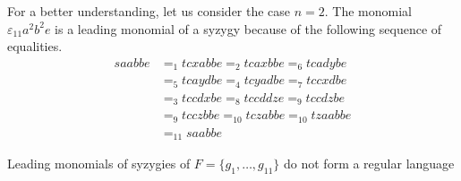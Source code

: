 \documentclass[sigconf]{acmart}
\theoremstyle{plain}
\theoremstyle{definition}
\theoremstyle{remark}
\begin{document}
For a better understanding, let us consider the case $n=2$. The monomial $\varepsilon_{11}a^2b^2e$ is a leading monomial of a syzygy because of the following sequence of equalities.
\begin{align*}
saabbe & =_{1} tcxabbe =_{2} tcaxbbe =_{6} tcadybe \\
& =_{5} tcaydbe =_{4} tcyadbe =_{7} tccxdbe \\
& =_{3} tccdxbe =_{8} tccddze =_{9} tccdzbe \\
& =_{9} tcczbbe =_{10} tczabbe =_{10} tzaabbe \\
& =_{11} saabbe
\end{align*}


\begin{proposition}
  Leading monomials of syzygies of $F=\{g_1,\dots,g_{11}\}$ do not form a regular language
\end{proposition}
\end{document}
